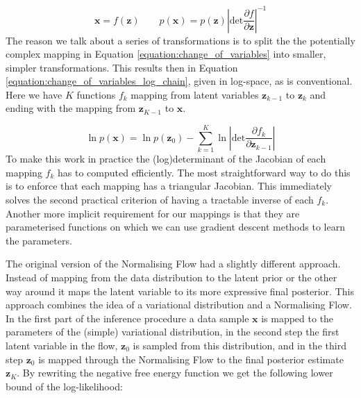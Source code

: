 \documentclass{report}
\newcommand{\bx}{\mathbf{x}}
\newcommand{\bz}{\mathbf{z}}
\newcommand{\parfrac}[2]{\frac{\partial #1}{\partial#2}}
\begin{document}
\begin{equation}\label{equation:change_of_variables}
    \bx = f(\bz) \qquad p(\bx) = p(\bz) \left|\text{det} \parfrac{f}{\bz} \right|^{-1}
\end{equation}
The reason we talk about a series of transformations is to split the the potentially complex mapping in Equation \ref{equation:change_of_variables} into smaller, simpler transformations. This results then in Equation \ref{equation:change_of_variables_log_chain}, given in log-space, as is conventional. Here we have $K$ functions $f_k$ mapping from latent variables $\bz_{k-1}$ to $\bz_k$ and ending with the mapping from $\bz_{K-1}$ to $\bx$.

\begin{equation}\label{equation:change_of_variables_log_chain}
    \ln p(\bx) = \ln p(\bz_0) - \sum\limits^K_{k=1}\ln \left| \text{det} \parfrac{f_k}{\bz_{k-1}} \right|
\end{equation}
To make this work in practice the (log)determinant of the Jacobian of each mapping $f_k$ has to computed efficiently. The most straightforward way to do this is to enforce that each mapping has a triangular Jacobian. This immediately solves the second practical criterion of having a tractable inverse of each $f_k$. Another more implicit requirement for our mappings is that they are parameterised functions on which we can use gradient descent methods to learn the parameters. 

The original version of the Normalising Flow had a slightly different approach. Instead of mapping from the data distribution to the latent prior or the other way around it maps the latent variable to its more expressive final posterior. This approach combines the idea of a variational distribution and a Normalising Flow. In the first part of the inference procedure a data sample $\bx$ is mapped to the parameters of the (simple) variational distribution, in the second step the first latent variable in the flow, $\bz_0$ is sampled from this distribution, and in the third step $\bz_0$ is mapped through the Normalising Flow to the final posterior estimate $\bz_K$. By rewriting the negative free energy function we get the following lower bound of the log-likelihood:
\end{document}
